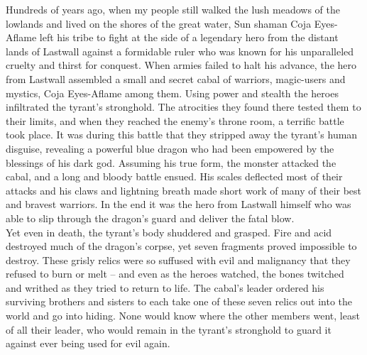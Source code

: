 {Hundreds of years ago, when my people still walked the lush meadows of the lowlands and lived on the shores of the great water, Sun shaman Coja Eyes-Aflame left his tribe to fight at the side of a legendary hero from the distant lands of Lastwall against a formidable ruler who was known for his unparalleled cruelty and thirst for conquest. When armies failed to halt his advance, the hero from Lastwall assembled a small and secret cabal of warriors, magic-users and mystics, Coja Eyes-Aflame among them. Using power and stealth the heroes infiltrated the tyrant's stronghold. The atrocities they found there tested them to their limits, and when they reached the enemy's throne room, a terrific battle took place. It was during this battle that they stripped away the tyrant's human disguise, revealing a powerful blue dragon who had been empowered by the blessings of his dark god. Assuming his true form, the monster attacked the cabal, and a long and bloody battle ensued. His scales deflected most of their attacks and his claws and lightning breath made short work of many of their best and bravest warriors. In the end it was the hero from Lastwall himself who was able to slip through the dragon's guard and deliver the fatal blow.\\

Yet even in death, the tyrant's body shuddered and grasped. Fire and acid destroyed much of the dragon's corpse, yet seven fragments proved impossible to destroy. These grisly relics were so suffused with evil and malignancy that they refused to burn or melt -- and even as the heroes watched, the bones twitched and writhed as they tried to return to life. The cabal's leader ordered his surviving brothers and sisters to each take one of these seven relics out into the world and go into hiding. None would know where the other members went, least of all their leader, who would remain in the tyrant's stronghold to guard it against ever being used for evil again.\\

}
